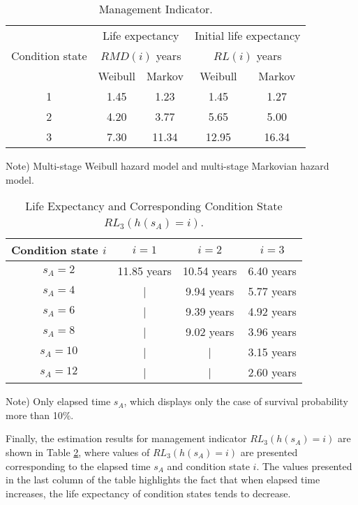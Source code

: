 \begin{table}[t]
\begin{center}
\caption{Management Indicator.}
\label{table34}
{\footnotesize
\begin{tabular}{c|c|c|c|c}
 & \multicolumn{2}{|c|}{Life expectancy} & \multicolumn{2}{|c}{Initial life expectancy} \\
Condition state & \multicolumn{2}{|c|}{$RMD(i)$ years} & \multicolumn{2}{|c}{$RL(i)$ years} \\ \cline{2-5}
 & Weibull & Markov & Weibull & Markov \\\hline
1 & 1.45 & 1.23 & 1.45 & 1.27 \\
2 & 4.20 & 3.77 & 5.65 & 5.00 \\
3 & 7.30 & 11.34 & 12.95 & 16.34 \\ \hline
\end{tabular}
}
\end{center}
\footnotesize Note)  Multi-stage Weibull hazard model and multi-stage Markovian hazard model.
\end{table}
\begin{table}[t]
\begin{center}
\caption{Life Expectancy and Corresponding Condition State $RL_{3}(h(s_A)=i)$.}
\label{table35}
{\footnotesize
\begin{tabular}{c|c|c|c}
Condition state $i$ & $i=1$  & $i=2$ & $i=3$ \\ \hline
$s_A=2$ & 11.85 years & 10.54 years & 6.40 years \\
$s_A=4$ & | & 9.94 years & 5.77 years \\
$s_A=6$ & | & 9.39 years & 4.92 years \\
$s_A=8$ & | & 9.02 years & 3.96 years \\
$s_A=10$ & | & | & 3.15 years \\
$s_A=12$ & | & | & 2.60 years \\ \hline
\end{tabular}
}
\end{center}
\footnotesize Note)  Only elapsed time $s_A$, which displays only the case of survival probability more than 10\%.
\end{table}

Finally, the estimation results for management indicator $RL_{3} (h(s_A)=i) $ are shown in Table \ref{table35}, where values of $RL_{3} (h(s_A)=i) $ are presented  corresponding to the elapsed time $s_A$ and condition state $i$. The values presented in the last column of the table highlights the fact that when elapsed time increases, the life expectancy of condition states tends to decrease.
